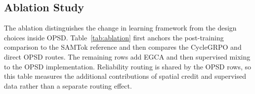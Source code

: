 \documentclass{article}
\begin{document}
\subsection{Ablation Study}
The ablation distinguishes the change in learning framework from the design choices inside OPSD. Table~\ref{tab:ablation} first anchors the post-training comparison to the SAMTok reference and then compares the CycleGRPO and direct OPSD routes. The remaining rows add EGCA and then supervised mixing to the OPSD implementation. Reliability routing is shared by the OPSD rows, so this table measures the additional contributions of spatial credit and supervised data rather than a separate routing effect.
\end{document}
